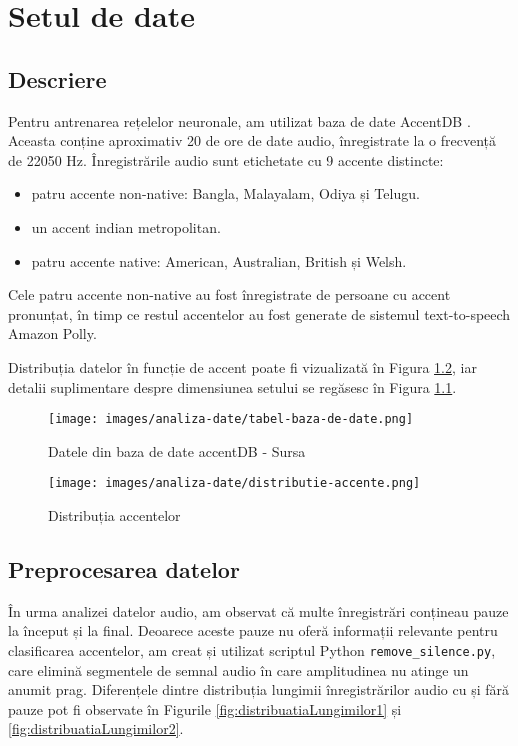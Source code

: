 \chapter{Setul de date}

\section{Descriere}

Pentru antrenarea rețelelor neuronale, am utilizat baza de date AccentDB \cite{accentDB}. Aceasta conține aproximativ 20 de ore de date audio, înregistrate la o frecvență de 22050 Hz. Înregistrările audio sunt etichetate cu 9 accente distincte:

\begin{itemize}
\item patru accente non-native: Bangla, Malayalam, Odiya și Telugu.
\item un accent indian metropolitan.
\item patru accente native: American, Australian, British și Welsh.
\end{itemize}

Cele patru accente non-native au fost înregistrate de persoane cu accent pronunțat, în timp ce restul accentelor au fost generate de sistemul text-to-speech Amazon Polly.

Distribuția datelor în funcție de accent poate fi vizualizată în Figura \ref{fig:distributiaAccentelor}, iar detalii suplimentare despre dimensiunea setului se regăsesc în Figura \ref{fig:tabelDate}.


\begin{figure}
    \centering
    \texttt{[image: images/analiza-date/tabel-baza-de-date.png]}
    \caption{Datele din baza de date accentDB - Sursa \cite{accentDB}}
    \label{fig:tabelDate}
\end{figure}

\begin{figure}
    \centering
    \texttt{[image: images/analiza-date/distributie-accente.png]}
    \caption{Distribuția accentelor}
    \label{fig:distributiaAccentelor}
\end{figure}


\section{Preprocesarea datelor}

În urma analizei datelor audio, am observat că multe înregistrări conțineau pauze la început și la final. Deoarece aceste pauze nu oferă informații relevante pentru clasificarea accentelor, am creat și utilizat scriptul Python \texttt{remove\_silence.py}, care elimină segmentele de semnal audio în care amplitudinea nu atinge un anumit prag. Diferențele dintre distribuția lungimii înregistrărilor audio cu și fără pauze pot fi observate în Figurile \ref{fig:distribuatiaLungimilor1} și \ref{fig:distribuatiaLungimilor2}.

